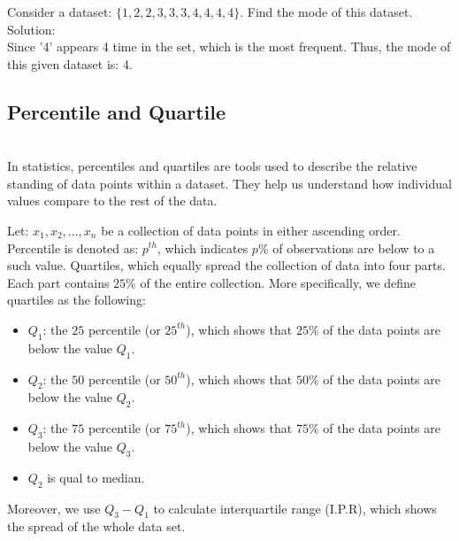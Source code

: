 \begin{example}
Consider a dataset: $\{1, 2, 2, 3, 3, 3, 4, 4, 4, 4\}$. Find the mode of this dataset.\\
Solution:\\
Since '4' appears 4 time in the set, which is the most frequent. Thus, the mode of this given dataset is: 4.
\end{example}

\subsection{Percentile and Quartile}\\

\noindent
In statistics, percentiles and quartiles are tools used to describe the relative standing of data points within a dataset. They help us understand how individual values compare to the rest of the data.

\begin{definition}
Let: $x_1, x_2, ..., x_n$ be a collection of data points in either ascending order. Percentile is denoted as: $p^{th}$, which indicates $p \%$ of observations are below to a such value. Quartiles, which equally spread the collection of data into four parts. Each part contains $25\%$ of the entire collection. More specifically, we define quartiles as the following:
\begin{itemize}
 \item $Q_1$: the $25$ percentile (or $25^{th}$), which shows that $25\%$ of the data points are below the value $Q_1$.
 \item $Q_2$: the $50$ percentile (or $50^{th}$), which shows that $50\%$ of the data points are below the value $Q_2$.
 \item $Q_3$: the $75$ percentile (or $75^{th}$), which shows that $75\%$ of the data points are below the value $Q_3$.
 \item $Q_2$ is qual to median.
\end{itemize}
Moreover, we use $Q_3 - Q_1$ to calculate interquartile range (I.P.R), which shows the spread of the whole data set.
\end{definition}
 
